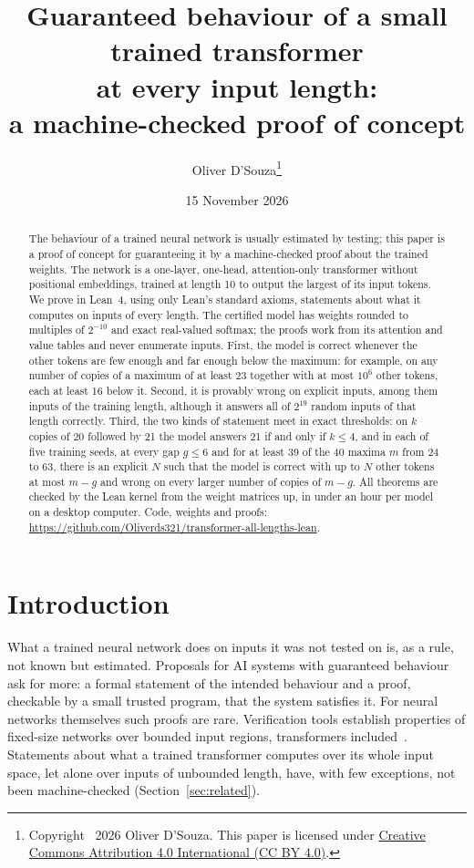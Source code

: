 \documentclass[11pt,a4paper]{article}
\title{Guaranteed behaviour of a small trained transformer\\at every input length:\\a machine-checked proof of concept}
\author{Oliver D'Souza\thanks{Copyright \textcopyright\ 2026 Oliver D'Souza. This paper is licensed under
\href{https://creativecommons.org/licenses/by/4.0/}{Creative Commons Attribution 4.0 International (CC BY 4.0)}.}}
\date{15 November 2026}
\begin{document}
\maketitle

\begin{abstract}
The behaviour of a trained neural network is usually estimated by testing; this
paper is a proof of concept for guaranteeing it by a machine-checked proof about
the trained weights. The network is a one-layer, one-head, attention-only
transformer without positional embeddings, trained at length 10 to output the
largest of its input tokens. We prove in Lean~4, using only Lean's standard
axioms, statements about what it computes on inputs of every length. The
certified model has weights rounded to multiples of $2^{-10}$ and exact
real-valued softmax; the proofs work from its attention and value tables and
never enumerate inputs.
First, the model is correct whenever the other tokens are few enough and far
enough below the maximum: for example, on any number of copies of a maximum of
at least 23 together with at most $10^6$ other tokens, each at least 16 below
it. Second, it is provably wrong on explicit inputs, among them inputs of the
training length, although it answers all of $2^{19}$ random inputs of that
length correctly. Third, the two kinds of statement meet in exact thresholds:
on $k$ copies of 20 followed by 21 the model answers 21 if and only if
$k\le4$, and in each of five training seeds, at every gap $g\le6$ and for at
least 39 of the 40 maxima $m$ from 24 to 63, there is an explicit $N$ such that
the model is correct with up to $N$ other tokens at most $m-g$ and wrong on
every larger number of copies of $m-g$. All theorems are checked by the Lean
kernel from the weight matrices up, in under an hour per model on a desktop
computer. Code, weights and proofs:
\url{https://github.com/Oliverds321/transformer-all-lengths-lean}.
\end{abstract}

\section{Introduction}

What a trained neural network does on inputs it was not tested on is, as a
rule, not known but estimated. Proposals for AI systems with guaranteed
behaviour~\cite{tegmark2023provably,dalrymple2024gsai} ask for more: a formal
statement of the intended behaviour and a proof, checkable by a small trusted
program, that the system satisfies it. For neural networks themselves such
proofs are rare. Verification tools establish properties of fixed-size networks
over bounded input regions, transformers
included~\cite{shi2020robustness,bonaert2021deept}. Statements about what a
trained transformer computes over its whole input space, let alone over inputs
of unbounded length, have, with few exceptions, not been machine-checked
(Section~\ref{sec:related}).
\end{document}
